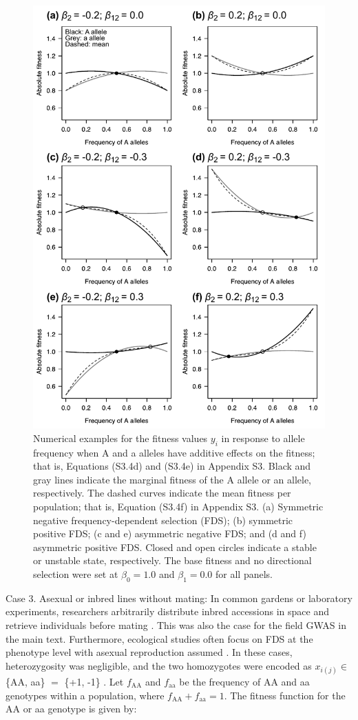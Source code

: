 \documentclass[12pt,]{article}
\begin{document}
\begin{figure}[]
  \includegraphics[width=0.75\linewidth]{FigS2_AsymFDSadd.pdf}
  \caption{Numerical examples for the fitness values $y_i$ in response to allele frequency when A and a alleles have additive effects on the fitness; that is, Equations (S3.4d) and (S3.4e) in Appendix S3. Black and gray lines indicate the marginal fitness of the A allele or an allele, respectively. The dashed curves indicate the mean fitness per population; that is, Equation (S3.4f) in Appendix S3. (a) Symmetric negative frequency-dependent selection (FDS); (b) symmetric positive FDS; (c and e) asymmetric negative FDS; and (d and f) asymmetric positive FDS. Closed and open circles indicate a stable or unstable state, respectively. The base fitness and no directional selection were set at $\beta_0=1.0$ and $\beta_1=0.0$ for all panels.}
  \label{figS2:FDSadd}
\end{figure}

Case 3. Asexual or inbred lines without mating: In common gardens or laboratory experiments, researchers arbitrarily distribute inbred accessions in space and retrieve individuals before mating \citep[for example,][]{schutz1969inter, sato2019neighbor}. This was also the case for the field GWAS in the main text. Furthermore, ecological studies often focus on FDS at the phenotype level with asexual reproduction assumed \citep[for example,][]{takahashi2018balanced}. In these cases, heterozygosity was negligible, and the two homozygotes were encoded as $x_{i(j)} \in $ \{AA, aa\} $=$ \{+1, -1\} \citep{sato2019neighbor}. Let $f_\mathrm{AA}$ and $f_\mathrm{aa}$ be the frequency of AA and aa genotypes within a population, where $f_\mathrm{AA} + f_\mathrm{aa} = 1$. The fitness function for the AA or aa genotype is given by:
\end{document}
